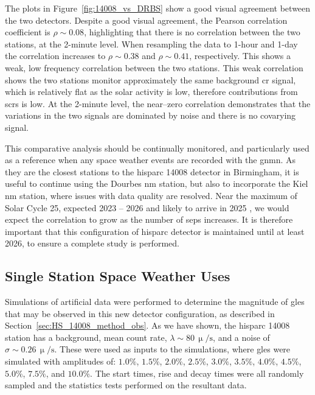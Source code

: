 The plots in Figure~\ref{fig:14008_vs_DRBS} show a good visual agreement between the two detectors. Despite a good visual agreement, the Pearson correlation coefficient is $\rho \sim 0.08$, highlighting that there is no correlation between the two stations, at the 2-minute level. When resampling the data to 1-hour and 1-day the correlation increases to $\rho \sim 0.38$ and $\rho \sim 0.41$, respectively. This shows a weak, low frequency correlation between the two stations. This weak correlation shows the two stations monitor approximately the same background \gls{cr} signal, which is relatively flat as the solar activity is low, therefore contributions from \glspl{scr} is low. At the 2-minute level, the near--zero correlation demonstrates that the variations in the two signals are dominated by noise and there is no covarying signal.

This comparative analysis should be continually monitored, and particularly used as a reference when any space weather events are recorded with the \gls{gnmn}. As they are the closest stations to the \gls{hisparc} 14008 detector in Birmingham, it is useful to continue using the Dourbes \gls{nm} station, but also to incorporate the Kiel \gls{nm} station, where issues with data quality are resolved. Near the maximum of Solar Cycle 25, expected 2023 -- 2026 and likely to arrive in 2025 \citep{mcintosh_overlapping_2020, pesnell_lessons_2020}, we would expect the correlation to grow as the number of \glspl{sep} increases. It is therefore important that this configuration of \gls{hisparc} detector is maintained until at least 2026, to ensure a complete study is performed.


\subsection{Single Station Space Weather Uses}\label{sec:HS_14008_single_sims}

Simulations of artificial data were performed to determine the magnitude of \glspl{gle} that may be observed in this new detector configuration, as described in Section~\ref{sec:HS_14008_method_obs}. As we have shown, the \gls{hisparc} 14008 station has a background, mean count rate, $\lambda \sim 80 \, \upmu/\mathrm{s}$, and a noise of $\sigma \sim 0.26 \, \upmu/\mathrm{s}$. These were used as inputs to the simulations, where \glspl{gle} were simulated with amplitudes of: $1.0\%$, $1.5\%$, $2.0\%$, $2.5\%$, $3.0\%$, $3.5\%$, $4.0\%$, $4.5\%$, $5.0\%$, $7.5\%$, and $10.0\%$. The start times, rise and decay times were all randomly sampled and the statistics tests performed on the resultant data.

